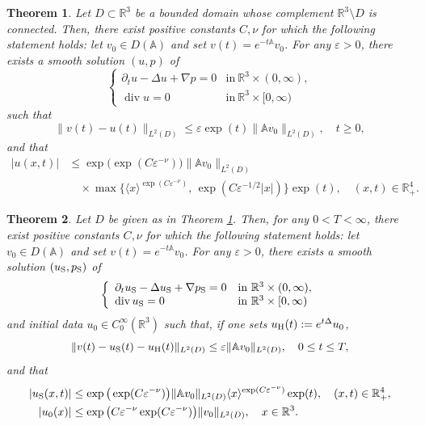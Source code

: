 \documentclass[11pt,a4paper]{article}
\numberwithin{equation}{section}
\newtheorem{theorem}{Theorem }[section]
\newcommand{\R}{\mathbb{R}}
\newcommand{\opdiv}{\operatorname{div}}
\newcommand{\eps}{\varepsilon}
\begin{document}
\begin{theorem}\label{thm.main1}
Let $D \subset \R^3$ be a bounded domain whose complement $\R^3\setminus D$ is connected. Then, there exist positive constants $C,\nu$ for which the following statement holds: let $v_0\in D({\mathbb A})$ and set $v(t) = e^{-t {\mathbb A}} v_0$. For any $\eps>0$, there exists a smooth solution $(u,p)$ of 
\[
    \left\{
    \begin{array}{ll}
    \partial_{t} u - \Delta u + \nabla p
    = 0&\mbox{in}\ \R^3\times (0,\infty),\\
    \opdiv u
    = 0&\mbox{in}\ \R^3\times [0,\infty) 
    \end{array}\right.
\]
such that 
\begin{equation}\label{approx.thm.main1}
    \|v(t) - u(t)\|_{L^2(D)} 
    \le \eps \exp(t) 
    \|{\mathbb A} v_0\|_{L^2(D)},
    \quad
    t \ge 0, 
\end{equation}
and that
\begin{equation}\label{est.thm.main1}
\begin{split}
    |u(x,t)|
    &\le 
    \exp\big(\exp(C\eps^{-\nu})\big)
    \|{\mathbb A} v_0\|_{L^2(D)} \\
    &\quad
    \times
    \max\big\{
    \langle x \rangle^{\exp (C\eps^{-\nu})}, \,
    \exp(C\eps^{-1/2} |x|) 
    \big\}
    \exp(t), 
    \quad
    (x,t) \in \R^4_{+}. 
\end{split}
\end{equation}
\end{theorem}


\begin{theorem}\label{thm.main2}
Let $D$ be given as in Theorem \ref{thm.main1}. Then, for any $0<T<\infty$, there exist positive constants $C,\nu$ for which the following statement holds: let $v_0\in D({\mathbb A})$ and set $v(t) = e^{-t {\mathbb A}} v_0$. For any $\eps>0$, there exists a smooth solution $(u_{{\rm S}}, p_{{\rm S}})$ of 
\[
    \left\{
    \begin{array}{ll}
    \partial_{t} u_{{\rm S}} - \Delta u_{{\rm S}} + \nabla p_{{\rm S}}
    = 0&\mbox{in}\ \R^3\times (0,\infty),\\
    \opdiv u_{{\rm S}}
    = 0&\mbox{in}\ \R^3\times [0,\infty) 
    \end{array}\right.
\]
and initial data $u_0\in C^\infty_0(\R^3)$ such that, if one sets $u_{{\rm H}}(t) := e^{t\Delta} u_0$, 
\begin{equation}\label{approx.thm.main2}
    \|v(t) - u_{{\rm S}}(t) - u_{{\rm H}}(t)\|_{L^2(D)}
    \le
    \eps
    \|{\mathbb A} v_0\|_{L^2(D)},
    \quad
    0 \le t \le T, 
\end{equation}
and that 
\begin{align}
    |u_{{\rm S}}(x,t)|
    &\le 
    \exp\big(\exp(C\eps^{-\nu})\big)
    \|{\mathbb A} v_0\|_{L^2(D)} 
    \langle x \rangle^{\exp (C\eps^{-\nu})}
    \exp(t), 
    \quad
    (x,t) \in \R^4_{+}, \label{est.u1.thm.main2} \\
    |u_0(x)|
    &\le 
    \exp\big(C\eps^{-\nu}\exp(C\eps^{-\nu})\big)
    \|v_0\|_{L^2(D)}, 
    \quad
    x \in \R^3. \label{est.u0.thm.main2}     
\end{align}
\end{theorem}
\end{document}
